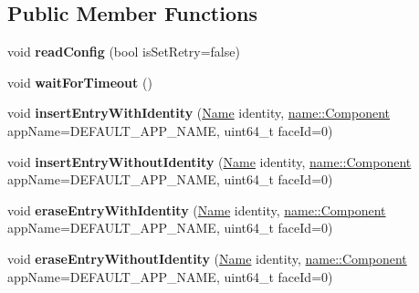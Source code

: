 \subsection*{Public Member Functions}
\begin{DoxyCompactItemize}
\item 
void {\bfseries read\+Config} (bool is\+Set\+Retry=false)\hypertarget{classnfd_1_1rib_1_1tests_1_1RemoteRegistratorFixture_a3c5047037715e02dbd2cc28c2c5c393b}{}\label{classnfd_1_1rib_1_1tests_1_1RemoteRegistratorFixture_a3c5047037715e02dbd2cc28c2c5c393b}

\item 
void {\bfseries wait\+For\+Timeout} ()\hypertarget{classnfd_1_1rib_1_1tests_1_1RemoteRegistratorFixture_a3ec3ab325618945a68ca8e5df70f9bcb}{}\label{classnfd_1_1rib_1_1tests_1_1RemoteRegistratorFixture_a3ec3ab325618945a68ca8e5df70f9bcb}

\item 
void {\bfseries insert\+Entry\+With\+Identity} (\hyperlink{classndn_1_1Name}{Name} identity, \hyperlink{classndn_1_1name_1_1Component}{name\+::\+Component} app\+Name=D\+E\+F\+A\+U\+L\+T\+\_\+\+A\+P\+P\+\_\+\+N\+A\+ME, uint64\+\_\+t face\+Id=0)\hypertarget{classnfd_1_1rib_1_1tests_1_1RemoteRegistratorFixture_a9dce7303242a50713fae053f58c21ba8}{}\label{classnfd_1_1rib_1_1tests_1_1RemoteRegistratorFixture_a9dce7303242a50713fae053f58c21ba8}

\item 
void {\bfseries insert\+Entry\+Without\+Identity} (\hyperlink{classndn_1_1Name}{Name} identity, \hyperlink{classndn_1_1name_1_1Component}{name\+::\+Component} app\+Name=D\+E\+F\+A\+U\+L\+T\+\_\+\+A\+P\+P\+\_\+\+N\+A\+ME, uint64\+\_\+t face\+Id=0)\hypertarget{classnfd_1_1rib_1_1tests_1_1RemoteRegistratorFixture_ae6c84a9a38b4cf49082ab1c8a2082801}{}\label{classnfd_1_1rib_1_1tests_1_1RemoteRegistratorFixture_ae6c84a9a38b4cf49082ab1c8a2082801}

\item 
void {\bfseries erase\+Entry\+With\+Identity} (\hyperlink{classndn_1_1Name}{Name} identity, \hyperlink{classndn_1_1name_1_1Component}{name\+::\+Component} app\+Name=D\+E\+F\+A\+U\+L\+T\+\_\+\+A\+P\+P\+\_\+\+N\+A\+ME, uint64\+\_\+t face\+Id=0)\hypertarget{classnfd_1_1rib_1_1tests_1_1RemoteRegistratorFixture_a01a639be5f9554f43e40e150abfab389}{}\label{classnfd_1_1rib_1_1tests_1_1RemoteRegistratorFixture_a01a639be5f9554f43e40e150abfab389}

\item 
void {\bfseries erase\+Entry\+Without\+Identity} (\hyperlink{classndn_1_1Name}{Name} identity, \hyperlink{classndn_1_1name_1_1Component}{name\+::\+Component} app\+Name=D\+E\+F\+A\+U\+L\+T\+\_\+\+A\+P\+P\+\_\+\+N\+A\+ME, uint64\+\_\+t face\+Id=0)\hypertarget{classnfd_1_1rib_1_1tests_1_1RemoteRegistratorFixture_a602391a5739592a18eae00093afaaf14}{}\label{classnfd_1_1rib_1_1tests_1_1RemoteRegistratorFixture_a602391a5739592a18eae00093afaaf14}


\end{DoxyCompactItemize}
